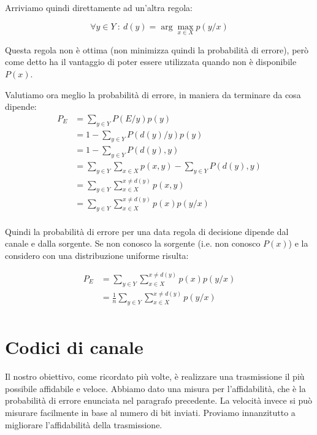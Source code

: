 Arriviamo quindi direttamente ad un'altra regola:
\begin{definizione}
\[
 \forall y \in Y \ : \ d(y)=\arg \max_{x \in X} p(y/x)
\]
\end{definizione}

Questa regola non è ottima (non minimizza quindi la probabilità di errore), però come detto ha il vantaggio di poter essere utilizzata
quando non è disponibile $P(x)$.

\noindent
Valutiamo ora meglio la probabilità di errore, in maniera da terminare da cosa dipende:
\[\begin{split}
 P_E&=\sum_{y \in Y} P(E/y)p(y) \\
    &=1-\sum_{y \in Y} P(d(y)/y)p(y) \\
    &=1-\sum_{y \in Y} P(d(y),y) \\
    &=\sum_{y \in Y}\sum_{x \in X} p(x,y) - \sum_{y \in Y} P(d(y),y) \\
    &=\sum_{y \in Y}\sum_{x \in X}^{x \neq d(y)} p(x,y) \\
    &=\sum_{y \in Y}\sum_{x \in X}^{x \neq d(y)} p(x)p(y/x) \\
 \end{split}
\]

Quindi la probabilità di errore per una data regola di decisione dipende dal canale e dalla sorgente.
Se non conosco la sorgente (i.e. non conosco $P(x)$) e la considero con una distribuzione uniforme risulta:

\begin{equation}
 \begin{split}
 P_E &=\sum_{y \in Y}\sum_{x \in X}^{x \neq d(y)} p(x)p(y/x) \\
     &=\frac{1}{n}\sum_{y \in Y}\sum_{x \in X}^{x \neq d(y)} p(y/x) \\
 \end{split}
\label{perr}
\end{equation}

\section{Codici di canale}
Il nostro obiettivo, come ricordato più volte, è realizzare una trasmissione il più possibile affidabile e veloce.
Abbiamo dato una misura per l'affidabilità, che è la probabilità di errore enunciata nel paragrafo precedente. La velocità invece 
si può misurare facilmente in base al numero di bit inviati. Proviamo innanzitutto a migliorare l'affidabilità della trasmissione.

